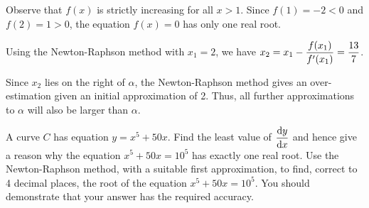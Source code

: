 \documentclass{echw}
\begin{document}

        Observe that $f(x)$ is strictly increasing for all $x > 1$. Since $f(1) = -2 < 0$ and $f(2) = 1 > 0$, the equation $f(x) = 0$ has only one real root.

        Using the Newton-Raphson method with $x_1 = 2$, we have $x_2 = x_1 - \dfrac{f(x_1)}{f^\prime(x_1)} = \dfrac{13}7$.


        \begin{center}
        \end{center}

        Since $x_2$ lies on the right of $\alpha$, the Newton-Raphson method gives an over-estimation given an initial approximation of 2. Thus, all further approximations to $\alpha$ will also be larger than $\alpha$.

    \problem{}
        A curve $C$ has equation $y = x^5 + 50x$. Find the least value of $\dfrac{\mathrm{d} y}{\mathrm{d} x}$ and hence give a reason why the equation $x^5+50x=10^5$ has exactly one real root. Use the Newton-Raphson method, with a suitable first approximation, to find, correct to 4 decimal places, the root of the equation $x^5+50x=10^5$. You should demonstrate that your answer has the required accuracy.
\end{document}
